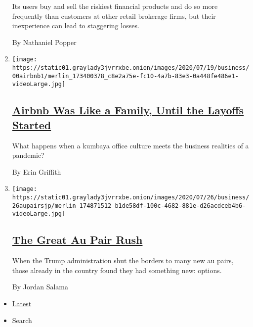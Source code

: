 \begin{enumerate}
  Its users buy and sell the riskiest financial products and do so more
  frequently than customers at other retail brokerage firms, but their
  inexperience can lead to staggering losses.

  By Nathaniel Popper
\item
  \texttt{[image: https://static01.graylady3jvrrxbe.onion/images/2020/07/19/business/00airbnb1/merlin\_173400378\_c8e2a75e-fc10-4a7b-83e3-0a448fe486e1-videoLarge.jpg]}

  \hypertarget{airbnb-was-like-a-family-until-the-layoffs-started}{%
  \subsection{\texorpdfstring{\href{/2020/07/17/technology/airbnb-coronavirus-layoffs-.html}{Airbnb
  Was Like a Family, Until the Layoffs
  Started}}{Airbnb Was Like a Family, Until the Layoffs Started}}\label{airbnb-was-like-a-family-until-the-layoffs-started}}

  What happens when a kumbaya office culture meets the business
  realities of a pandemic?

  By Erin Griffith
\item
  \texttt{[image: https://static01.graylady3jvrrxbe.onion/images/2020/07/26/business/26aupairsjp/merlin\_174871512\_b1de58df-100c-4682-881e-d26acdceb4b6-videoLarge.jpg]}

  \hypertarget{the-great-au-pair-rush}{%
  \subsection{\texorpdfstring{\href{/2020/07/25/business/the-great-au-pair-rush.html}{The
  Great Au Pair
  Rush}}{The Great Au Pair Rush}}\label{the-great-au-pair-rush}}

  When the Trump administration shut the borders to many new au pairs,
  those already in the country found they had something new: options.

  By Jordan Salama
\end{enumerate}

\begin{itemize}
\tightlist
\item
  \protect\hyperlink{stream-panel}{Latest}
\item
  Search
\end{itemize}

